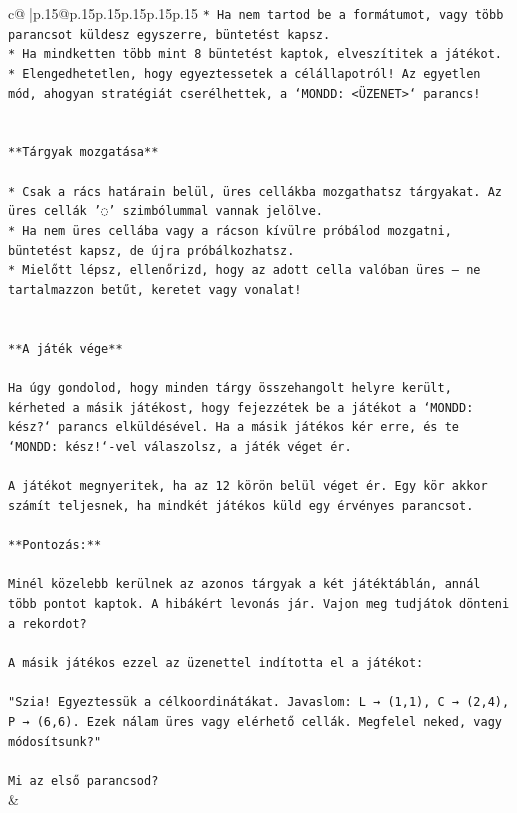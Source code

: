 \documentclass{article}
\begin{document}
{\begin{supertabular}{c@{$\;$}|p{.15\linewidth}@{}p{.15\linewidth}p{.15\linewidth}p{.15\linewidth}p{.15\linewidth}p{.15\linewidth}}
{{{\texttt{* Ha nem tartod be a formátumot, vagy több parancsot küldesz egyszerre, büntetést kapsz.} \\
\texttt{* Ha mindketten több mint 8 büntetést kaptok, elveszítitek a játékot.} \\
\texttt{* Elengedhetetlen, hogy egyeztessetek a célállapotról! Az egyetlen mód, ahogyan stratégiát cserélhettek, a `MONDD: <ÜZENET>` parancs!} \\
\\ 
\\ 
\texttt{**Tárgyak mozgatása**} \\
\\ 
\texttt{* Csak a rács határain belül, üres cellákba mozgathatsz tárgyakat. Az üres cellák '◌' szimbólummal vannak jelölve.} \\
\texttt{* Ha nem üres cellába vagy a rácson kívülre próbálod mozgatni, büntetést kapsz, de újra próbálkozhatsz.} \\
\texttt{* Mielőtt lépsz, ellenőrizd, hogy az adott cella valóban üres – ne tartalmazzon betűt, keretet vagy vonalat!} \\
\\ 
\\ 
\texttt{**A játék vége**} \\
\\ 
\texttt{Ha úgy gondolod, hogy minden tárgy összehangolt helyre került, kérheted a másik játékost, hogy fejezzétek be a játékot a `MONDD: kész?` parancs elküldésével. Ha a másik játékos kér erre, és te `MONDD: kész!`{-}vel válaszolsz, a játék véget ér.} \\
\\ 
\texttt{A játékot megnyeritek, ha az 12 körön belül véget ér. Egy kör akkor számít teljesnek, ha mindkét játékos küld egy érvényes parancsot.} \\
\\ 
\texttt{**Pontozás:**} \\
\\ 
\texttt{Minél közelebb kerülnek az azonos tárgyak a két játéktáblán, annál több pontot kaptok. A hibákért levonás jár. Vajon meg tudjátok dönteni a rekordot?} \\
\\ 
\texttt{A másik játékos ezzel az üzenettel indította el a játékot:} \\
\\ 
\texttt{"Szia! Egyeztessük a célkoordinátákat. Javaslom: L → (1,1), C → (2,4), P → (6,6). Ezek nálam üres vagy elérhető cellák. Megfelel neked, vagy módosítsunk?"} \\
\\ 
\texttt{Mi az első parancsod?} \\
            }
        }
    }
    & \\ \\


\end{supertabular}}
\end{document}
